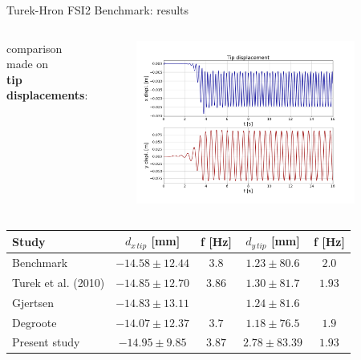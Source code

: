 \documentclass[10pt,t]{beamer}
\begin{document}
\begin{frame}{Turek-Hron FSI2 Benchmark: results}

\begin{columns}

comparison made on \\ \textbf{tip displacements}:



\vspace{-1cm}
\begin{figure}[htbp!]
	\includegraphics[width=0.9\textwidth, trim=20 20 20 20, clip]{images/FSI2/disp_fsi2_pres.png}
\end{figure}


\end{columns}





\footnotesize
\begin{center}
\begin{tabular}{ l | c c | c c  |  } 
	Study & $d_{x\,tip}$ [\si{mm}] & f [\si{Hz}] & $d_{y\,tip}$ [\si{mm}] & f [\si{Hz}] \\ 
	\hline
	\hline
	Benchmark & $-14.58\pm12.44$ & $3.8$ & $1.23\pm80.6$ & $2.0$ \\
	Turek et al. (2010) & $-14.85\pm12.70$ & $3.86$ & $1.30\pm81.7$ & $1.93$ \\
	Gjertsen & $-14.83\pm13.11$ & & $1.24\pm81.6$ & \\
	Degroote & $-14.07\pm12.37$ & $3.7$ & $1.18\pm76.5$ & $1.9$ \\
	\hline
	Present study & $-14.95\pm9.85$ & $3.87$ & $2.78\pm83.39$ & $1.93$ \\ 
\end{tabular}
    
\end{center}
\vspace{0.2cm}

\end{frame}
\end{document}
